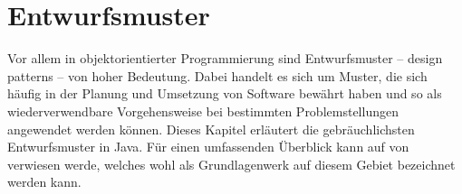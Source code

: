 \section{Entwurfsmuster}\label{designPattern}

Vor allem in objektorientierter Programmierung sind Entwurfsmuster -- \engl design patterns -- von hoher Bedeutung. Dabei handelt es sich um Muster, die sich häufig in der Planung und Umsetzung von Software bewährt haben und so als wiederverwendbare Vorgehensweise bei bestimmten Problemstellungen angewendet werden können. Dieses Kapitel erläutert die gebräuchlichsten Entwurfsmuster in Java. Für einen umfassenden Überblick kann auf  von \citeauthor{gamma_design_1995} verwiesen werde, welches wohl als Grundlagenwerk auf diesem Gebiet bezeichnet werden kann.




